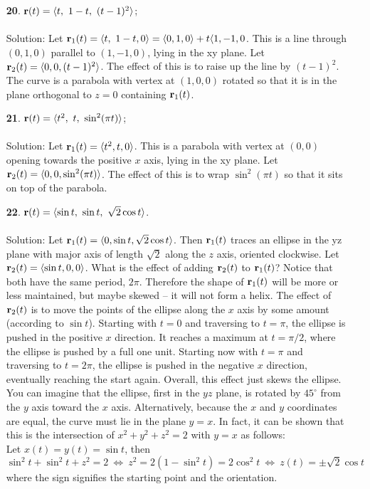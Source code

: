 \documentclass[12pt]{amsbook}
\newcommand{\la}{\langle}
\newcommand{\ra}{\rangle}
\begin{document}
\begin{enumerate}
  {\sc Solution}: Let ${\bf r}_1(t)=\la \sin t, \ \cos t , 0\ra$. This is clearly a circle oriented clockwise. Let ${\bf r}_2(t)=\la 0,0,\ln t\ra$. Since $\ln t$ is always increasing and nonnegative, this is a helical shape above the $x$ axis of radius $1$. Notably, it is simply $\ln t$ wrapped around the cylinder $x^2+y^2=1$.
  \\
  \item[{\small\bf 20}.] ${\bf r}(t) = \la t, \ 1-t , \ (t-1)^2 \ra$;
  \\
  \\
  {\sc Solution}: Let ${\bf r}_1(t)=\la t, \ 1-t , 0\ra=\la 0,1,0\ra + t\la 1,-1,0$. This is a line through $(0,1,0)$ parallel to $(1,-1,0)$, lying in the xy plane. Let ${\bf r}_2(t)=\la 0,0,(t-1)^2\ra$. The effect of this is to raise up the line by $(t-1)^2$. The curve is a parabola with vertex at $(1,0,0)$ rotated so that it is in the plane orthogonal to $z=0$ containing ${\bf r}_1(t)$. 
  \\
  \item[{\small\bf 21}.] ${\bf r}(t) = \la t^2, \ t, \ \sin^2(\pi t) \ra$;
  \\
  \\
  {\sc Solution}: Let ${\bf r}_1(t)=\la t^2, t , 0\ra$. This is a parabola with vertex at $(0,0)$ opening towards the positive $x$ axis, lying in the xy plane. Let ${\bf r}_2(t)=\la 0,0,\sin^2(\pi t)\ra$. The effect of this is to wrap $\sin^2(\pi t)$ so that it sits on top of the parabola. 
  \\
  \item[{\small\bf 22}.] ${\bf r}(t) = \la \sin t, \ \sin t, \ \sqrt{2}\cos t \ra$.
  \\
  \\
  {\sc Solution}: Let ${\bf r}_1(t)=\la 0, \sin t , \sqrt{2} \cos t\ra$. Then ${\bf r}_1(t)$ traces an ellipse in the yz plane with major axis of length $\sqrt{2}$ along the $z$ axis, oriented clockwise. Let ${\bf r}_2(t)=\la \sin t,0,0 \ra$. What is the effect of adding ${\bf r}_2(t)$ to ${\bf r}_1(t)$? Notice that both have the same period, $2\pi$. Therefore the shape of ${\bf r}_1(t)$ will be more or less maintained, but maybe skewed -- it will not form a helix. The effect of ${\bf r}_2(t)$ is to move the points of the ellipse along the $x$ axis by some amount (according to $\sin t$). Starting with $t=0$ and traversing to $t=\pi$, the ellipse is pushed in the positive $x$ direction. It reaches a maximum at $t=\pi/2$, where the ellipse is pushed by a full one unit. Starting now with $t=\pi$ and traversing to $t=2\pi$, the ellipse is pushed in the negative $x$ direction, eventually reaching the start again. Overall, this effect just skews the ellipse. You can imagine that the ellipse, first in the $yz$ plane, is rotated by $45^{\circ}$ from the $y$ axis toward the $x$ axis. Alternatively, because the $x$ and $y$ coordinates are equal, the curve must lie in the plane $y=x$. In fact, it can be shown that this is the intersection of $x^2+y^2+z^2=2$ with $y=x$ as follows:
 \\
 Let $x(t)=y(t)=\sin t$, then 
 $$\sin^2 t+\sin^2 t +z^2=2 \ \Leftrightarrow \ z^2=2(1-\sin^2 t)=2\cos^2 t \ \Leftrightarrow \ z(t)=\pm \sqrt{2}\cos t$$
 where the sign signifies the starting point and the orientation.
 \end{enumerate}
\end{document}
